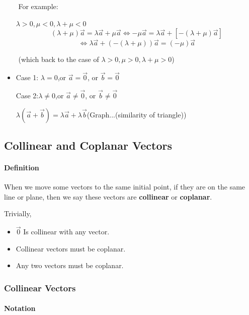 \documentclass[UTF8]{ctexart}
\begin{document}
\begin{itemize}
​	For example: 

​	$\lambda >0 , \mu <0,\lambda +\mu <0 $ 
$$
(\lambda +\mu )\vec a = \lambda \vec a +\mu \vec a \iff -\mu \vec a  = \lambda \vec a +[-(\lambda +\mu )\vec a ]
$$
$$
\iff \lambda \vec  a +(-(\lambda + \mu ))\vec a  = (-\mu) \vec a
$$



​	(which back to the case of $\lambda >0 , \mu >0 ,\lambda + \mu >0$)



\item Case 1: $\lambda = 0$,or $\vec a = \vec 0$, or $\vec b= \vec 0 $

Case 2:$\lambda \neq 0$,or $\vec a \neq \vec 0$, or $\vec b\neq \vec 0 $

$\lambda( \vec  a + \vec  b) = \lambda \vec a +\lambda \vec b $(Graph...(similarity of triangle))


\end{itemize}

\subsection{Collinear and Coplanar Vectors}

\paragraph{Definition}

When we move some vectors to the same initial point, if they are on the same line or plane, then we say these vectors are \textbf{collinear }or \textbf{coplanar}. 

Trivially,

\begin{itemize}

\item $\vec 0 $ Is collinear with any vector. 
\item Collinear vectors must be coplanar.
\item Any two vectors must be coplanar.

\end{itemize}


\subsubsection{ Collinear Vectors}


\paragraph{Notation}
\end{document}
